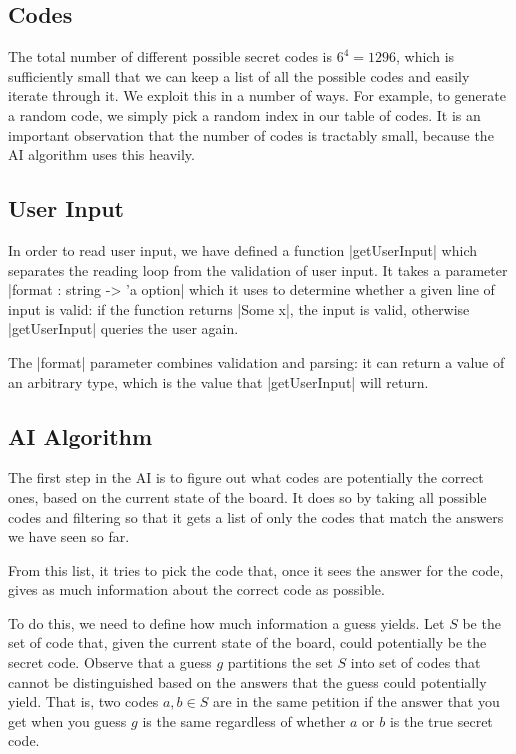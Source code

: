 \documentclass[a4paper]{article}
\begin{document}
\subsection{Codes}

The total number of different possible secret codes is \(6^4 = 1296\), which is sufficiently small that we can keep a list of all the possible codes and easily iterate through it. We exploit this in a number of ways. For example, to generate a random code, we simply pick a random index in our table of codes. It is an important observation that the number of codes is tractably small, because the AI algorithm uses this heavily.

\subsection{User Input}

In order to read user input, we have defined a function \code|getUserInput| which separates the reading loop from the validation of user input. It takes a parameter \code|format : string -> 'a option| which it uses to determine whether a given line of input is valid: if the function returns \code|Some x|, the input is valid, otherwise \code|getUserInput| queries the user again.

The \code|format| parameter combines validation and parsing: it can return a value of an arbitrary type, which is the value that \code|getUserInput| will return. 

\subsection{AI Algorithm} \label{sec:AI Algorithm}

The first step in the AI is to figure out what codes are potentially the correct ones, based on the current state of the board. It does so by taking all possible codes and filtering so that it gets a list of only the codes that match the answers we have seen so far.

From this list, it tries to pick the code that, once it sees the answer for the code, gives as much information about the correct code as possible.

To do this, we need to define how much information a guess yields. Let \(S\) be the set of code that, given the current state of the board, could potentially be the secret code. Observe that a guess \(g\) partitions the set \(S\) into set of codes that cannot be distinguished based on the answers that the guess could potentially yield. That is, two codes \(a, b \in S\) are in the same petition if the answer that you get when you guess \(g\) is the same regardless of whether \(a\) or \(b\) is the true secret code.
\end{document}

